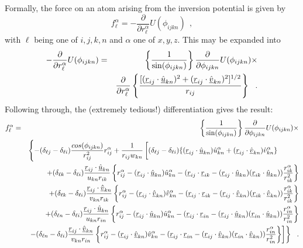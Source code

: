Formally, the force on an atom arising from the
inversion potential is given by
\begin{equation}
f_{\ell}^{\alpha} = -\frac{\partial}{\partial
r_{\ell}^{\alpha}}U(\phi_{ijkn})~~,
\end{equation}
with $\ell$ being one of $i,j,k,n$ and $\alpha$ one of $x,y,z$.
This may be expanded into
\begin{eqnarray}
-\frac{\partial}{\partial r_{\ell}^{\alpha}}U(\phi_{ijkn})&=&
\left\{ \frac{1}{\sin(\phi_{ijkn})} \right\}
\frac{\partial}{\partial \phi_{ijkn}}U(\phi_{ijkn})\times \nonumber \\
& & \frac{\partial}{\partial r_{\ell}^{\alpha}} \left\{
\frac{[(\mbox{$\underline{r}$}_{ij}\cdot\mbox{$\underline{\hat{u}}$}_{kn})^{2}
+(\mbox{$\underline{r}$}_{ij}\cdot\mbox{$\underline{\hat{v}}$}_{kn})^{2}]^{1/2}} {r_{ij}}
\right\}~~.
\end{eqnarray}
Following through, the (extremely tedious!) differentiation gives
the result:
\begin{eqnarray}
f_{\ell}^{\alpha} &=&
\left\{\frac{1}{\sin(\phi_{ijkn})}\right\}
\frac{\partial}{\partial \phi_{ijkn}}U(\phi_{ijkn})\times \\
& &
\left\{-(\delta_{\ell j}-\delta_{\ell i})\frac{cos(\phi_{ijkn})}
{r_{ij}^{2}}r_{ij}^{\alpha} +\frac{1}{r_{ij}w_{kn}}\left [
(\delta_{\ell j}-\delta_{\ell i})
\{(\vek{r}_{ij}\cdot\vek{\hat{u}}_{kn})\hat{u}_{kn}^{\alpha}+
(\vek{r}_{ij}\cdot\vek{\hat{v}}_{kn})\hat{v}_{kn}^{\alpha}\}
\phantom{\left\{\frac{a_{a}^{a}}{a_{a}^{a}}\right\}}
\right. \right. \nonumber \\
& & + (\delta_{\ell k}-\delta_{\ell i})
\frac{\vek{r}_{ij}\cdot\vek{\hat{u}}_{kn}}{u_{kn}r_{ik}}\left \{
r_{ij}^{\alpha}-(\vek{r}_{ij}\cdot\vek{\hat{u}}_{kn})\hat{u}_{kn}^{\alpha}
-(\vek{r}_{ij}\cdot\vek{r}_{ik}-(\vek{r}_{ij}\cdot\vek{\hat{u}}_{kn})
(\vek{r}_{ik}\cdot\vek{\hat{u}}_{kn}))\frac{r_{ik}^{\alpha}}{r_{ik}^{2}}
\right \} \nonumber \\
& & + (\delta_{\ell k}-\delta_{\ell i})
\frac{\vek{r}_{ij}\cdot\vek{\hat{v}}_{kn}}{v_{kn}r_{ik}}\left \{
r_{ij}^{\alpha}-(\vek{r}_{ij}\cdot\vek{\hat{v}}_{kn})\hat{v}_{kn}^{\alpha}
-(\vek{r}_{ij}\cdot\vek{r}_{ik}-(\vek{r}_{ij}\cdot\vek{\hat{v}}_{kn})
(\vek{r}_{ik}\cdot\vek{\hat{v}}_{kn}))\frac{r_{ik}^{\alpha}}{r_{ik}^{2}}
\right \} \nonumber \\
& &+ (\delta_{\ell n}-\delta_{\ell i})
\frac{\vek{r}_{ij}\cdot\vek{\hat{u}}_{kn}}{u_{kn}r_{in}}\left \{
r_{ij}^{\alpha}-(\vek{r}_{ij}\cdot\vek{\hat{u}}_{kn})\hat{u}_{kn}^{\alpha}
-(\vek{r}_{ij}\cdot\vek{r}_{in}-(\vek{r}_{ij}\cdot\vek{\hat{u}}_{kn})
(\vek{r}_{in}\cdot\vek{\hat{u}}_{kn}))\frac{r_{in}^{\alpha}}{r_{in}^{2}}
\right \} \nonumber \\
& & \left . \left .- (\delta_{\ell n}-\delta_{\ell i})
\frac{\vek{r}_{ij}\cdot\vek{\hat{v}}_{kn}}{v_{kn}r_{in}}\left \{
r_{ij}^{\alpha}-(\vek{r}_{ij}\cdot\vek{\hat{v}}_{kn})\hat{v}_{kn}^{\alpha}
-(\vek{r}_{ij}\cdot\vek{r}_{in}-(\vek{r}_{ij}\cdot\vek{\hat{v}}_{kn})
(\vek{r}_{in}\cdot\vek{\hat{v}}_{kn}))\frac{r_{in}^{\alpha}}{r_{in}^{2}}
\right \} \right ] \right \}~~. \nonumber
\end{eqnarray}
